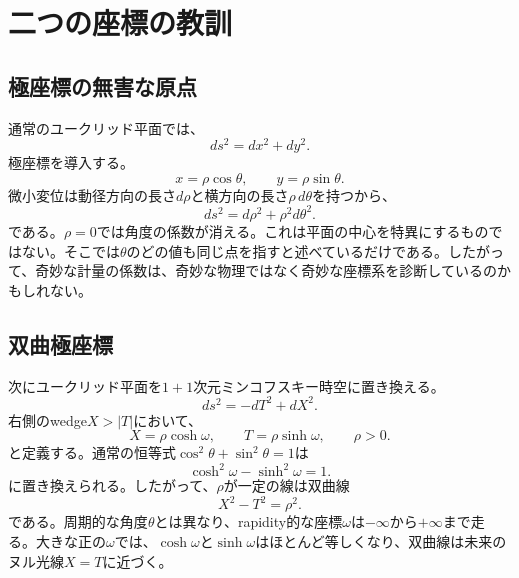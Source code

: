 \section{二つの座標の教訓}

\subsection{極座標の無害な原点}

通常のユークリッド平面では、
\begin{equation}
ds^2=dx^2+dy^2.
\end{equation}
極座標を導入する。
\begin{equation}
x=\rho\cos\theta,
\qquad
y=\rho\sin\theta .
\end{equation}
微小変位は動径方向の長さ\(d\rho\)と横方向の長さ\(\rho\,d\theta\)を持つから、
\begin{equation}
ds^2=d\rho^2+\rho^2d\theta^2.
\label{eq:l03-polar}
\end{equation}
である。\(\rho=0\)では角度の係数が消える。これは平面の中心を特異にするものではない。そこでは\(\theta\)のどの値も同じ点を指すと述べているだけである。したがって、奇妙な計量の係数は、奇妙な物理ではなく奇妙な座標系を診断しているのかもしれない。

\subsection{双曲極座標}

次にユークリッド平面を\(1+1\)次元ミンコフスキー時空に置き換える。
\begin{equation}
ds^2=-dT^2+dX^2.
\end{equation}
右側のwedge\(X>|T|\)において、
\begin{equation}
X=\rho\cosh\omega,
\qquad
T=\rho\sinh\omega,
\qquad \rho>0 .
\label{eq:l03-rindler-transform}
\end{equation}
と定義する。通常の恒等式\(\cos^2\theta+\sin^2\theta=1\)は
\begin{equation}
\cosh^2\omega-\sinh^2\omega=1.
\end{equation}
に置き換えられる。したがって、\(\rho\)が一定の線は双曲線
\begin{equation}
X^2-T^2=\rho^2.
\end{equation}
である。周期的な角度\(\theta\)とは異なり、rapidity的な座標\(\omega\)は\(-\infty\)から\(+\infty\)まで走る。大きな正の\(\omega\)では、\(\cosh\omega\)と\(\sinh\omega\)はほとんど等しくなり、双曲線は未来のヌル光線\(X=T\)に近づく。


